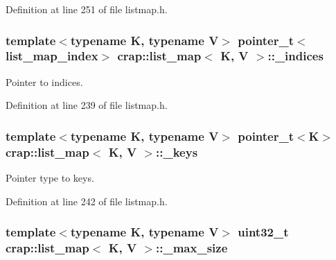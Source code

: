 Definition at line 251 of file listmap.\+h.

\hypertarget{classcrap_1_1list__map_a3adb0e770ab21d2634db1fd04afffb27}{}
\subsubsection[{\+\_\+indices}]{\setlength{\rightskip}{0pt plus 5cm}template$<$typename K, typename V$>$ {\bf pointer\+\_\+t}$<${\bf list\+\_\+map\+\_\+index}$>$ {\bf crap\+::list\+\_\+map}$<$ K, V $>$\+::\+\_\+indices\hspace{0.3cm}{\ttfamily [protected]}}\label{classcrap_1_1list__map_a3adb0e770ab21d2634db1fd04afffb27}


Pointer to indices. 



Definition at line 239 of file listmap.\+h.

\hypertarget{classcrap_1_1list__map_a2051a003947b8cd7eb227f2d4f102b89}{}
\subsubsection[{\+\_\+keys}]{\setlength{\rightskip}{0pt plus 5cm}template$<$typename K, typename V$>$ {\bf pointer\+\_\+t}$<$K$>$ {\bf crap\+::list\+\_\+map}$<$ K, V $>$\+::\+\_\+keys\hspace{0.3cm}{\ttfamily [protected]}}\label{classcrap_1_1list__map_a2051a003947b8cd7eb227f2d4f102b89}


Pointer type to keys. 



Definition at line 242 of file listmap.\+h.

\hypertarget{classcrap_1_1list__map_a9197e36a3c061b0c4e030f3f31d28563}{}
\subsubsection[{\+\_\+max\+\_\+size}]{\setlength{\rightskip}{0pt plus 5cm}template$<$typename K, typename V$>$ uint32\+\_\+t {\bf crap\+::list\+\_\+map}$<$ K, V $>$\+::\+\_\+max\+\_\+size\hspace{0.3cm}{\ttfamily [protected]}}\label{classcrap_1_1list__map_a9197e36a3c061b0c4e030f3f31d28563}



